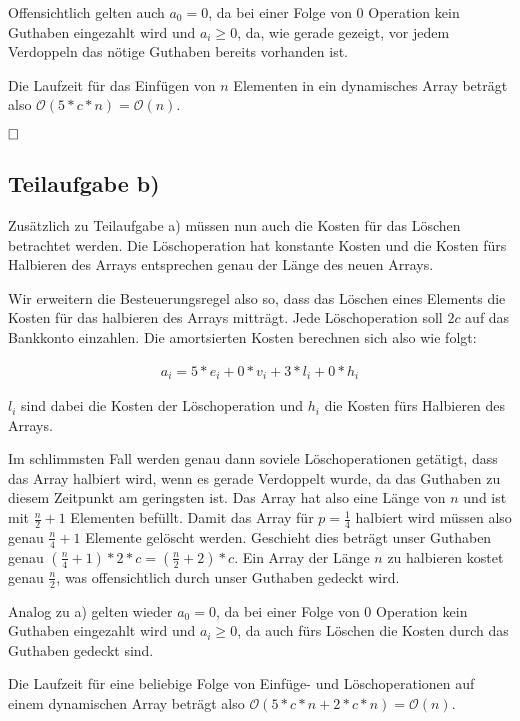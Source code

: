 \documentclass[12pt]{scrartcl}%
\theoremstyle{nonumberplain}
\newcommand{\bO}[1]{\mathcal O(#1)}
\begin{document}
Offensichtlich gelten auch $a_0 = 0$, da bei einer Folge von 0 Operation kein Guthaben eingezahlt wird und $a_i \ge 0$, da, wie gerade gezeigt, vor jedem Verdoppeln das nötige Guthaben bereits vorhanden ist.

Die Laufzeit für das Einfügen von $n$ Elementen in ein dynamisches Array beträgt also $\bO{5 * c * n} = \bO{n}$.

$\hfill \square$

\subsection*{Teilaufgabe b)}

Zusätzlich zu Teilaufgabe a) müssen nun auch die Kosten für das Löschen betrachtet werden. Die Löschoperation hat konstante Kosten und die Kosten fürs Halbieren des Arrays entsprechen genau der Länge des neuen Arrays.

Wir erweitern die Besteuerungsregel also so, dass das Löschen eines Elements die Kosten für das halbieren des Arrays mitträgt. Jede Löschoperation soll $2c$ auf das Bankkonto einzahlen. Die amortsierten Kosten berechnen sich also wie folgt:

\begin{align*}
a_i = 5*e_i + 0*v_i +3*l_i + 0*h_i
\end{align*}

$l_i$ sind dabei die Kosten der Löschoperation und $h_i$ die Kosten fürs Halbieren des Arrays.

Im schlimmsten Fall werden genau dann soviele Löschoperationen getätigt, dass das Array halbiert wird, wenn es gerade Verdoppelt wurde, da das Guthaben zu diesem Zeitpunkt am geringsten ist. Das Array hat also eine Länge von $n$ und ist mit $\frac{n}{2} + 1$ Elementen befüllt. Damit das Array für $p = \frac{1}{4}$ halbiert wird müssen also genau $\frac{n}{4}+1$ Elemente gelöscht werden. Geschieht dies beträgt unser Guthaben genau $(\frac{n}{4}+1) * 2*c = (\frac{n}{2}+2)*c$. Ein Array der Länge $n$ zu halbieren kostet genau $\frac{n}{2}$, was offensichtlich durch unser Guthaben gedeckt wird.

Analog zu a) gelten wieder $a_0 = 0$, da bei einer Folge von 0 Operation kein Guthaben eingezahlt wird und $a_i \ge 0$, da auch fürs Löschen die Kosten durch das Guthaben gedeckt sind.

Die Laufzeit für eine beliebige Folge von Einfüge- und Löschoperationen auf einem dynamischen Array beträgt also $\bO{5 * c * n + 2*c*n} = \bO{n}$.
\end{document}
